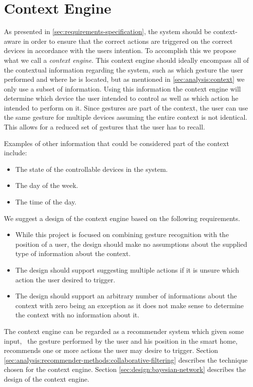 \section{Context Engine}
\label{sec:analysis:context-engine}

As presented in \cref{sec:requirements-specification}, the system should be context-aware in order to ensure that the correct actions are triggered on the correct devices in accordance with the users intention.
To accomplish this we propose what we call a \emph{context engine}.
This context engine should ideally encompass all of the contextual information regarding the system, such as which gesture the user performed and where he is located, but as mentioned in \cref{sec:analysis:context} we only use a subset of information. 
Using this information the context engine will determine which device the user intended to control as well as which action he intended to perform on it.
Since gestures are part of the context, the user can use the same gesture for multiple devices assuming the entire context is not identical.
This allows for a reduced set of gestures that the user has to recall.

Examples of other information that could be considered part of the context include:

\begin{itemize}
\item The state of the controllable devices in the system.
\item The day of the week.
\item The time of the day.
\end{itemize}

We suggest a design of the context engine based on the following requirements.

\begin{itemize}
\item While this project is focused on combining gesture recognition with the position of a user, the design should make no assumptions about the supplied type of information about the context.
\item The design should support suggesting multiple actions if it is unsure which action the user desired to trigger.
\item The design should support an arbitrary number of informations about the context with zero being an exception as it does not make sense to determine the context with no information about it.
\end{itemize}

The context engine can be regarded as a recommender system which given some input, \eg~the gesture performed by the user and his position in the smart home, recommends one or more actions the user may desire to trigger. Section \ref{sec:analysis:recommender-methods:collaborative-filtering} describes the technique chosen for the context engine. Section \ref{sec:design:bayesian-network} describes the design of the context engine.

